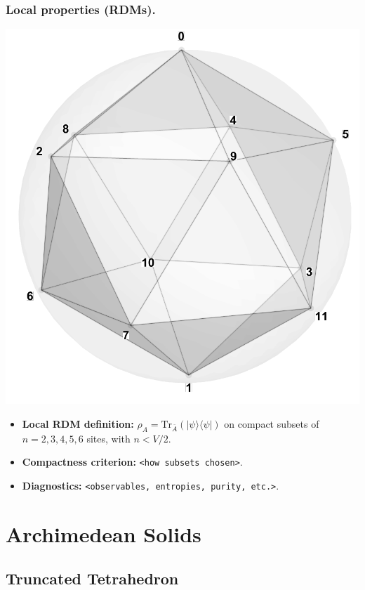\documentclass[11pt,a4paper]{article}
\begin{document}
\subsubsection*{Local properties (RDMs).}
\begin{center}
  \includegraphics[width=.6\linewidth]{icosahedron}
\end{center}

\begin{itemize}[leftmargin=1.5em]
  \item \textbf{Local RDM definition:} $\rho_A=\mathrm{Tr}_{\bar A}(|\psi\rangle\langle\psi|)$ on compact subsets of $n=2,3,4,5,6$ sites, with $n < V/2$.
  \item \textbf{Compactness criterion:} \texttt{<how subsets chosen>}.
  \item \textbf{Diagnostics:} \texttt{<observables, entropies, purity, etc.>}.
\end{itemize}



\section*{Archimedean Solids}

\subsection*{Truncated Tetrahedron}
\end{document}
